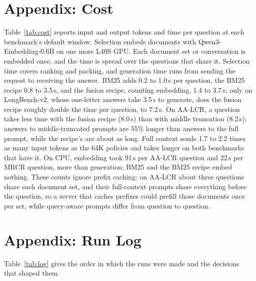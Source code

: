 \documentclass[letterpaper]{article} %
\newcommand{\recipe}{fusion recipe}
\begin{document}
\section{Appendix: Cost}
Table~\ref{tab:cost} reports input and output tokens and time per question at each benchmark's default window. Selection embeds documents with Qwen3-Embedding-0.6B on one more L40S GPU. Each document set or conversation is embedded once, and the time is spread over the questions that share it. Selection time covers ranking and packing, and generation time runs from sending the request to receiving the answer. BM25 adds 0.2 to 1.0\,s per question, the BM25 recipe 0.8 to 3.5\,s, and the \recipe{}, counting embedding, 1.4 to 3.7\,s; only on LongBench-v2, whose one-letter answers take 3.5\,s to generate, does the \recipe{} roughly double the time per question, to 7.2\,s. On AA-LCR, a question takes less time with the \recipe{} (8.0\,s) than with middle truncation (8.2\,s): answers to middle-truncated prompts are 55\% longer than answers to the full prompt, while the recipe's are about as long. Full context sends 1.7 to 2.2 times as many input tokens as the 64K policies and takes longer on both benchmarks that have it. On CPU, embedding took 91\,s per AA-LCR question and 22\,s per MRCR question, more than generation; BM25 and the BM25 recipe embed nothing. These counts ignore prefix caching: on AA-LCR about three questions share each document set, and their full-context prompts share everything before the question, so a server that caches prefixes could prefill those documents once per set, while query-aware prompts differ from question to question.

\begin{table}[t]
\centering
\small

\caption{Input and output tokens and time per question at each benchmark's default window; full context is the 262K run. Output is the mean answer length in tokens; LongBench-v2's answers are a single letter. Capped is the number of answers that reach the 4,096-token cap. Embedding is the time to build the document index with Qwen3-Embedding-0.6B, spread over the questions that share a document set or conversation: on one L40S GPU in these runs, and on CPU in an earlier run of the same dense configuration on another machine. Select is retrieval and packing; Generate is the model's generation time.}
\label{tab:cost}
\end{table}

\section{Appendix: Run Log}
Table~\ref{tab:log} gives the order in which the runs were made and the decisions that shaped them.
\end{document}
